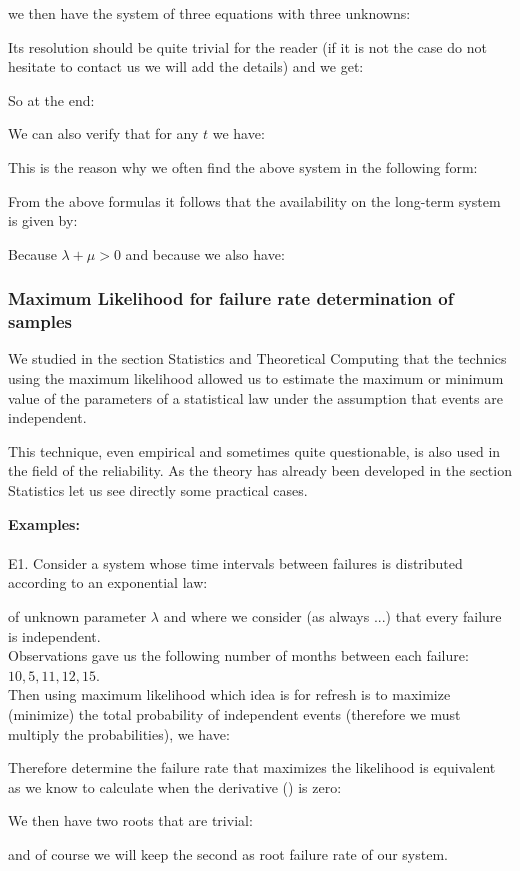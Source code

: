	we then have the system of three equations with three unknowns:
	
 	Its resolution should be quite trivial for the reader (if it is not the case do not hesitate to contact us we will add the details) and we get:
	
	So at the end:
	
	We can also verify that for any $t$ we have:
	
 	This is the reason why we often find the above system in the following form:
	
 	From the above formulas it follows that the availability on the long-term system is given by:
	
 	Because $\lambda+\mu>0$ and because we also have:
	
	
	\pagebreak
	\subsubsection{Maximum Likelihood for failure rate determination of samples}
	We studied in the section Statistics and Theoretical Computing that the technics using the maximum likelihood allowed us to estimate the maximum or minimum value of the parameters of a statistical law under the assumption that events are independent.
	
	This technique, even empirical and sometimes quite questionable, is also used in the field of the reliability. As the theory has already been developed in the section Statistics let us see directly some practical cases.
	\begin{tcolorbox}[colframe=black,colback=white,sharp corners]
	\textbf{{\Large {}}Examples:}\\\\
	E1. Consider a system whose time intervals between failures is distributed according to an exponential law:
	
	of unknown parameter $\lambda$ and where we consider (as always ...) that every failure is independent.\\
	
	Observations gave us the following number of months between each failure: $10, 5, 11, 12, 15$.\\
	
	Then using maximum likelihood which idea is for refresh is to maximize (minimize) the total probability of independent events (therefore we must multiply the probabilities), we have:
	
	Therefore determine the failure rate that maximizes the likelihood is equivalent as we know to calculate when the derivative () is zero:
	
	We then have two roots that are trivial:
	
	and of course we will keep the second as root failure rate of our system.
	\end{tcolorbox}
	
